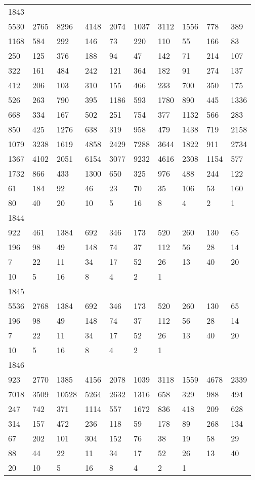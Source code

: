 \begin{longtable}{*{10}{l}}
1843&&&&&&&&&\\
5530& 2765& 8296& 4148& 2074& 1037& 3112& 1556& 778& 389\\
1168& 584& 292& 146& 73& 220& 110& 55& 166& 83\\
250& 125& 376& 188& 94& 47& 142& 71& 214& 107\\
322& 161& 484& 242& 121& 364& 182& 91& 274& 137\\
412& 206& 103& 310& 155& 466& 233& 700& 350& 175\\
526& 263& 790& 395& 1186& 593& 1780& 890& 445& 1336\\
668& 334& 167& 502& 251& 754& 377& 1132& 566& 283\\
850& 425& 1276& 638& 319& 958& 479& 1438& 719& 2158\\
1079& 3238& 1619& 4858& 2429& 7288& 3644& 1822& 911& 2734\\
1367& 4102& 2051& 6154& 3077& 9232& 4616& 2308& 1154& 577\\
1732& 866& 433& 1300& 650& 325& 976& 488& 244& 122\\
61& 184& 92& 46& 23& 70& 35& 106& 53& 160\\
80& 40& 20& 10& 5& 16& 8& 4& 2& 1\\

1844&&&&&&&&&\\
922& 461& 1384& 692& 346& 173& 520& 260& 130& 65\\
196& 98& 49& 148& 74& 37& 112& 56& 28& 14\\
7& 22& 11& 34& 17& 52& 26& 13& 40& 20\\
10& 5& 16& 8& 4& 2& 1& \\

1845&&&&&&&&&\\
5536& 2768& 1384& 692& 346& 173& 520& 260& 130& 65\\
196& 98& 49& 148& 74& 37& 112& 56& 28& 14\\
7& 22& 11& 34& 17& 52& 26& 13& 40& 20\\
10& 5& 16& 8& 4& 2& 1& \\

1846&&&&&&&&&\\
923& 2770& 1385& 4156& 2078& 1039& 3118& 1559& 4678& 2339\\
7018& 3509& 10528& 5264& 2632& 1316& 658& 329& 988& 494\\
247& 742& 371& 1114& 557& 1672& 836& 418& 209& 628\\
314& 157& 472& 236& 118& 59& 178& 89& 268& 134\\
67& 202& 101& 304& 152& 76& 38& 19& 58& 29\\
88& 44& 22& 11& 34& 17& 52& 26& 13& 40\\
20& 10& 5& 16& 8& 4& 2& 1& \\


\end{longtable}
